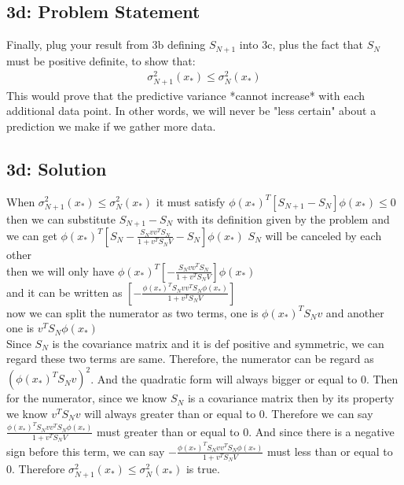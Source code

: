 \documentclass[10pt]{article}
\newcommand{\officialdirections}[1]{{\color{purple} #1}}
\begin{document}
\officialdirections{
\subsection*{3d: Problem Statement}
Finally, plug your result from 3b defining $S_{N+1}$ into 3c, plus the fact that $S_N$ must be positive definite, to show that:
\begin{align}
\sigma_{N+1}^2(x_*) \leq \sigma_N^2(x_*)
\end{align}
This would prove that the predictive variance *cannot increase* with each additional data point. In other words, we will never be "less certain" about a prediction we make if we gather more data.
}


\subsection{3d: Solution}
When $\sigma_{N+1}^2(x_*) \leq \sigma_N^2(x_*)$ it must satisfy $\phi(x_*)^T \left[ S_{N+1} - S_{N} \right] \phi(x_*) \leq 0$
then we can substitute $S_{N+1} - S_{N}$ with its definition given by the problem and we can get 
$\phi(x_*)^T \left[ S_N - \frac{S_Nvv^TS_N}{1+v^TS_NV} - S_N \right] \phi(x_*)$ $S_N$ will be canceled by each other
\\
 then we will only have $\phi(x_*)^T \left[  - \frac{S_Nvv^TS_N}{1+v^TS_NV}  \right] \phi(x_*)$
 \\
and it can be written as $[  - \frac{\phi(x_*)^TS_Nvv^TS_N\phi(x_*)}{1+v^TS_NV}] $
\\
now we can split the numerator as two terms, one is $\phi(x_*)^TS_Nv$ and another one is $v^TS_N\phi(x_*)$
\\
Since $S_N$ is the covariance matrix and it is def positive and symmetric, we can regard these two terms are same. Therefore, the numerator can be regard as $(\phi(x_*)^TS_Nv)^2$. And the quadratic form will always bigger or equal to 0. Then for the numerator, since we know $S_N$ is a covariance matrix then by its property we know $v^TS_Nv$ will always greater than or equal to 0. Therefore we can say $\frac{\phi(x_*)^TS_Nvv^TS_N\phi(x_*)}{1+v^TS_NV}$ must greater than or equal to 0. And since there is a negative sign before this term, we can say $ - \frac{\phi(x_*)^TS_Nvv^TS_N\phi(x_*)}{1+v^TS_NV}$ must less than or equal to 0. Therefore $\sigma_{N+1}^2(x_*) \leq \sigma_N^2(x_*)$ is true.
\end{document}
